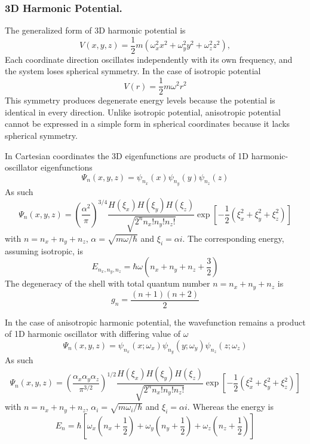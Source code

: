 \documentclass[../../../main.tex]{subfiles}
\begin{document}
\subsubsection{3D Harmonic Potential.}
The generalized form of 3D harmonic potential is
\begin{equation*}
  V(x, y, z) = \frac{1}{2}m(\omega_{x}^{2}x^{2} + \omega_{y}^{2}y^{2} + \omega_{z}^{2}z^{2}),
\end{equation*}
Each coordinate direction oscillates independently with its own frequency, and the system loses spherical symmetry.
In the case of isotropic potential
\begin{equation*}
  V(r) = \frac{1}{2}m\omega^{2}r^{2}
\end{equation*}
This symmetry produces degenerate energy levels because the potential is identical in every direction.
Unlike isotropic potential, anisotropic potential cannot be expressed in a simple form in spherical coordinates because it lacks spherical symmetry.

In Cartesian coordinates the 3D eigenfunctions are products of 1D harmonic-oscillator eigenfunctions
\begin{equation*}
  \Psi_n(x, y, z) = \psi_{n_x}(x) \psi_{n_y}(y) \psi_{n_z}(z)
\end{equation*}
As such
\begin{equation*}
  \Psi_n(x, y, z) = \left( \frac{\alpha^2}{\pi } \right)^{3/4} \frac{H(\xi_x) H(\xi_y) H(\xi_z)}{\sqrt{2^{n}n_x!  n_y! n_z!}}  \exp \left[ -\frac{1}{2} (\xi_x^2 + \xi_y^2 + \xi_z^2) \right]
\end{equation*}
with $n=n_x+n_y+n_z$, $\alpha = \sqrt{m\omega/\hbar }$ and $ \xi_i = \alpha i$.
The corresponding energy, assuming isotropic, is
\begin{equation*}
  E_{n_{x},n_{y},n_{z}} = \hbar \omega \left(n_{x} + n_{y} + n_{z} + \frac{3}{2}  \right)
\end{equation*}
The degeneracy of the shell with total quantum number $n=n_x+n_y+n_z$ is
\begin{equation*}
  g_n=\frac{(n+1)(n+2 )}{2}
\end{equation*}

In the case of anisotropic harmonic potential, the wavefunction remains a product of 1D harmonic oscillator with differing value of $\omega$
\begin{equation*}
  \Psi_n(x, y, z) = \psi_{n_x}(x; \omega_x) \psi_{n_y}(y; \omega_y) \psi_{n_z}(z; \omega_z)
\end{equation*}
As such
\begin{equation*}
  \Psi_n(x, y, z) = \left( \frac{\alpha_x \alpha_y \alpha_z}{\pi^{3/2}} \right)^{1/2} \frac{H(\xi_x) H(\xi_y) H(\xi_z)}{\sqrt{2^{n}n_x!  n_y! n_z!}}  \exp \left[ -\frac{1}{2} (\xi_x^2 + \xi_y^2 + \xi_z^2) \right]
\end{equation*}
with $n=n_x+n_y+n_z$, $\alpha_i = \sqrt{m\omega_i/\hbar }$ and $ \xi_i = \alpha i$.
Whereas the energy is
\begin{equation*}
  E_n = \hbar \left[  \omega_x \left(n_x + \frac{1}{2}  \right) + \omega_y \left(n_y + \frac{1}{2}  \right) + \omega_z \left(n_z + \frac{1}{2}  \right)  \right]
\end{equation*}
\end{document}
